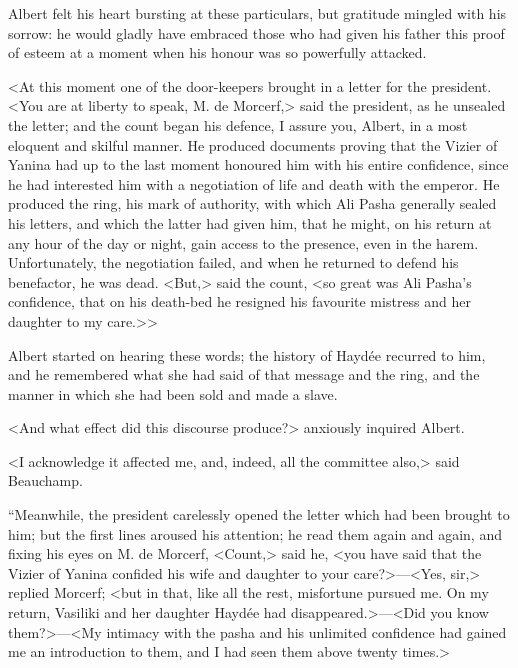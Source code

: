  Albert felt his heart bursting at these particulars, but gratitude mingled with his sorrow: he would gladly have embraced those who had given his father this proof of esteem at a moment when his honour was so powerfully attacked. 

 <At this moment one of the door-keepers brought in a letter for the president. <You are at liberty to speak, M. de Morcerf,> said the president, as he unsealed the letter; and the count began his defence, I assure you, Albert, in a most eloquent and skilful manner. He produced documents proving that the Vizier of Yanina had up to the last moment honoured him with his entire confidence, since he had interested him with a negotiation of life and death with the emperor. He produced the ring, his mark of authority, with which Ali Pasha generally sealed his letters, and which the latter had given him, that he might, on his return at any hour of the day or night, gain access to the presence, even in the harem. Unfortunately, the negotiation failed, and when he returned to defend his benefactor, he was dead. <But,> said the count, <so great was Ali Pasha's confidence, that on his death-bed he resigned his favourite mistress and her daughter to my care.>> 

 Albert started on hearing these words; the history of Haydée recurred to him, and he remembered what she had said of that message and the ring, and the manner in which she had been sold and made a slave. 

 <And what effect did this discourse produce?> anxiously inquired Albert. 

 <I acknowledge it affected me, and, indeed, all the committee also,> said Beauchamp. 

 “Meanwhile, the president carelessly opened the letter which had been brought to him; but the first lines aroused his attention; he read them again and again, and fixing his eyes on M. de Morcerf, <Count,> said he, <you have said that the Vizier of Yanina confided his wife and daughter to your care?>—<Yes, sir,> replied Morcerf; <but in that, like all the rest, misfortune pursued me. On my return, Vasiliki and her daughter Haydée had disappeared.>—<Did you know them?>—<My intimacy with the pasha and his unlimited confidence had gained me an introduction to them, and I had seen them above twenty times.> 

